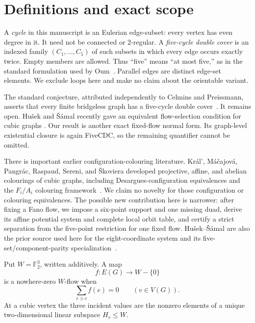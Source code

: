 \documentclass[11pt]{article}
\theoremstyle{definition}
\theoremstyle{remark}
\newcommand{\F}{\mathbb F}
\newcommand{\FiveCDC}{\textup{FiveCDC}}
\numberwithin{equation}{section}
\begin{document}
\section{Definitions and exact scope}

A \emph{cycle} in this manuscript is an Eulerian edge-subset: every
vertex has even degree in it.  It need not be connected or 2-regular.
A \emph{five-cycle double cover} is an indexed family
\((C_1,\ldots,C_5)\) of such subsets in which every edge occurs exactly
twice.  Empty members are allowed.  Thus ``five'' means ``at most five,''
as in the standard formulation used by Oum~\cite{Oum2026}.  Parallel
edges are distinct edge-set elements.  We exclude loops here and make no
claim about the orientable variant.

The standard conjecture, attributed independently to Celmins and
Preissmann, asserts that every finite bridgeless graph has a five-cycle
double cover~\cite{Celmins1984,Preissmann1981,HusekSamal2026,Oum2026}.
It remains open.  Hu\v{s}ek and \v{S}\'amal recently gave an equivalent
flow-selection condition for cubic graphs
\cite[Theorem~3.16 and Conjecture~3.19]{HusekSamal2026}.  Our result is
another exact fixed-flow normal form.  Its graph-level existential closure
is again \FiveCDC, so the remaining quantifier cannot be omitted.

There is important earlier configuration-colouring literature.
Kr\'al', M\'a\v{c}ajov\'a, Pangr\'ac, Raspaud, Sereni, and
\v{S}koviera developed projective, affine, and abelian colourings of
cubic graphs, including Desargues-configuration equivalences and the
\(F_i/A_i\) colouring framework~\cite{KralEtAl2009}.  We claim no novelty
for those configuration or colouring equivalences.  The possible new
contribution here is narrower: after fixing a Fano flow, we impose a
six-point support and one missing duad, derive its affine potential system
and complete local orbit table, and certify a strict separation from the
five-point restriction for one fixed flow.  Hu\v{s}ek--\v{S}\'amal are
also the prior source used here for the eight-coordinate system and its
five-set/component-parity specialization~\cite{HusekSamal2026}.

Put \(W=\F_2^3\), written additively.  A map
\[
                    f:E(G)\longrightarrow W-\{0\}
\]
is a nowhere-zero \(W\)-flow when
\[
                    \sum_{e\ni v}f(e)=0
                    \qquad(v\in V(G)).
\]
At a cubic vertex the three incident values are the nonzero elements of
a unique two-dimensional linear subspace \(H_v\le W\).
\end{document}
